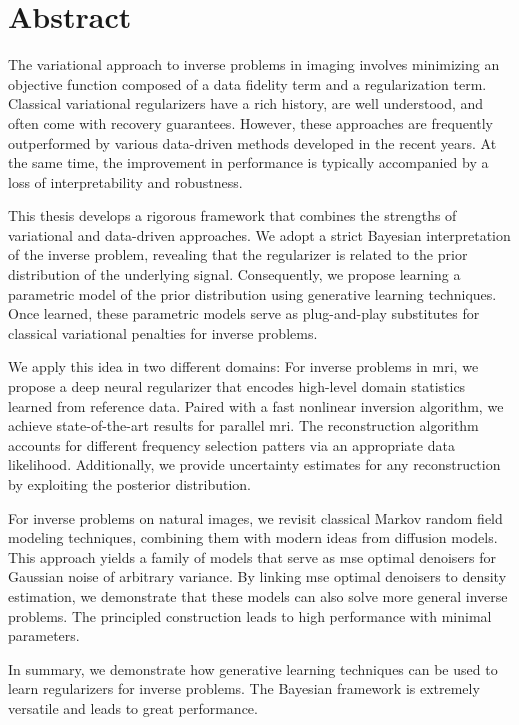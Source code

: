 \chapter*{Abstract}
The variational approach to inverse problems in imaging involves minimizing an objective function composed of a data fidelity term and a regularization term.
Classical variational regularizers have a rich history, are well understood, and often come with recovery guarantees.
However, these approaches are frequently outperformed by various data-driven methods developed in the recent years.
At the same time, the improvement in performance is typically accompanied by a loss of interpretability and robustness.

This thesis develops a rigorous framework that combines the strengths of variational and data-driven approaches.
We adopt a strict Bayesian interpretation of the inverse problem, revealing that the regularizer is related to the prior distribution of the underlying signal.
Consequently, we propose learning a parametric model of the prior distribution using generative learning techniques.
Once learned, these parametric models serve as plug-and-play substitutes for classical variational penalties for inverse problems.

We apply this idea in two different domains:
For inverse problems in \gls{mri}, we propose a deep neural regularizer that encodes high-level domain statistics learned from reference data.
Paired with a fast nonlinear inversion algorithm, we achieve state-of-the-art results for parallel \gls{mri}.
The reconstruction algorithm accounts for different frequency selection patters via an appropriate data likelihood.
Additionally, we provide uncertainty estimates for any reconstruction by exploiting the posterior distribution.

For inverse problems on natural images, we revisit classical Markov random field modeling techniques, combining them with modern ideas from diffusion models.
This approach yields a family of models that serve as \gls{mse} optimal denoisers for Gaussian noise of arbitrary variance.
By linking \gls{mse} optimal denoisers to density estimation, we demonstrate that these models can also solve more general inverse problems.
The principled construction leads to high performance with minimal parameters.

In summary, we demonstrate how generative learning techniques can be used to learn regularizers for inverse problems.
The Bayesian framework is extremely versatile and leads to great performance.


